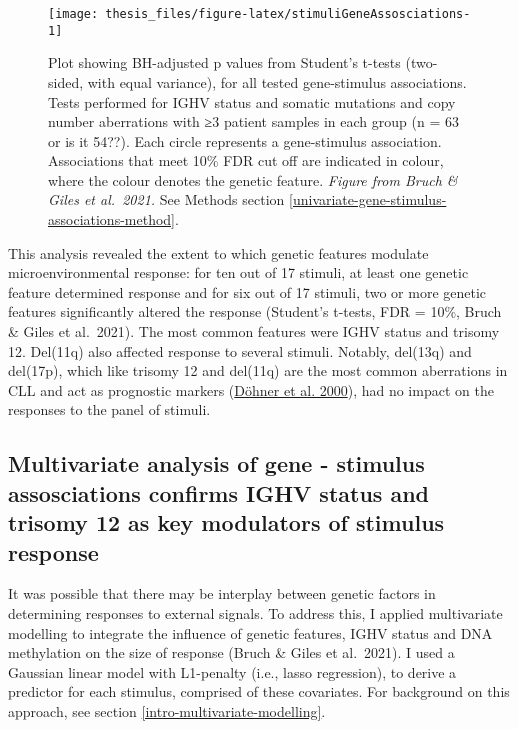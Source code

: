 \documentclass[11pt, a4paper, twosided]{book}
\begin{document}
\begin{figure}

{\centering \texttt{[image: thesis\_files/figure-latex/stimuliGeneAssosciations-1]} 

}

\caption{Plot showing BH-adjusted p values from Student's t-tests (two-sided, with equal variance), for all tested gene-stimulus associations. Tests performed for IGHV status and somatic mutations and copy number aberrations with ≥3 patient samples in each group (n = 63 or is it 54??). Each circle represents a gene-stimulus association. Associations that meet 10\% FDR cut off are indicated in colour, where the colour denotes the genetic feature. \emph{Figure from Bruch \& Giles et al.~2021.} See Methods section \ref{univariate-gene-stimulus-associations-method}.}\label{fig:stimuliGeneAssosciations}
\end{figure}
This analysis revealed the extent to which genetic features modulate microenvironmental response: for ten out of 17 stimuli, at least one genetic feature determined response and for six out of 17 stimuli, two or more genetic features significantly altered the response (Student's t-tests, FDR = 10\%, Bruch \& Giles et al.~2021). The most common features were IGHV status and trisomy 12. Del(11q) also affected response to several stimuli. Notably, del(13q) and del(17p), which like trisomy 12 and del(11q) are the most common aberrations in CLL and act as prognostic markers (\protect\hyperlink{ref-Dohner2000}{Döhner et al. 2000}), had no impact on the responses to the panel of stimuli.

\hypertarget{multivariate-gene-stimulus-assosciations}{%
\subsection{Multivariate analysis of gene - stimulus assosciations confirms IGHV status and trisomy 12 as key modulators of stimulus response}\label{multivariate-gene-stimulus-assosciations}}

It was possible that there may be interplay between genetic factors in determining responses to external signals. To address this, I applied multivariate modelling to integrate the influence of genetic features, IGHV status and DNA methylation on the size of response (Bruch \& Giles et al.~2021). I used a Gaussian linear model with L1-penalty (i.e., lasso regression), to derive a predictor for each stimulus, comprised of these covariates. For background on this approach, see section \ref{intro-multivariate-modelling}.
\end{document}
